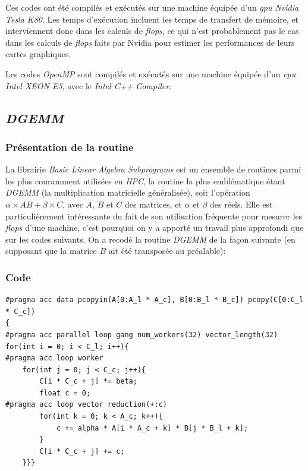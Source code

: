 \documentclass{article}
\begin{document}
Ces codes ont été compilés et exécutés sur une machine équipée d'un \textit{\gls{gpu} Nvidia Tesla K80}. Les temps d'exécution incluent les temps de transfert de mémoire, et interviennent donc dans les calculs de \textit{\gls{flops}}, ce qui n'est probablement pas le cas dans les calculs de \textit{\gls{flops}} faits par Nvidia pour estimer les performances de leurs cartes graphiques.

Les codes \textit{OpenMP} sont compilés et exécutés sur une machine équipée d'un \textit{\gls{cpu} Intel XEON E5}, avec le \textit{Intel C++ Compiler}.

\subsection{\textit{DGEMM}}

\subsubsection{Présentation de la routine}

La librairie \textit{Basic Linear Algebra Subprograms} est un ensemble de routines parmi les plus couramment utilisées en \textit{HPC}, la routine la plus emblématique étant \textit{DGEMM} (la multiplication matricielle généralisée), soit l'opération $\alpha \times AB + \beta \times C$, avec $A$, $B$ et $C$ des matrices, et $\alpha$ et $\beta$ des réels. Elle est particulièrement intéressante du fait de son utilisation fréquente pour mesurer les \textit{\gls{flops}} d'une machine, c'est pourquoi on y a apporté un travail plus approfondi que sur les codes suivants.
On a recodé la routine \textit{DGEMM} de la façon suivante (en supposant que la matrice $B$ ait été transposée au préalable):

\subsubsection{Code}

\begin{lstlisting}[caption={Implémentation de \textit{DGEMM} avec \textit{OpenACC}}]
#pragma acc data pcopyin(A[0:A_l * A_c], B[0:B_l * B_c]) pcopy(C[0:C_l * C_c])
{
#pragma acc parallel loop gang num_workers(32) vector_length(32) 
for(int i = 0; i < C_l; i++){
#pragma acc loop worker 
	for(int j = 0; j < C_c; j++){
		C[i * C_c + j] *= beta;
		float c = 0;
#pragma acc loop vector reduction(+:c)
		for(int k = 0; k < A_c; k++){
			c += alpha * A[i * A_c + k] * B[j * B_l + k];
		}
		C[i * C_c + j] += c;
	}}}
\end{lstlisting}
\end{document}
